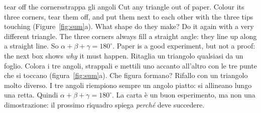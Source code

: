 \begin{think}{tear off the corners}{strappa gli angoli}
Cut any triangle out of paper. Colour its three corners, tear them off, and put them next to each other with the three tips touching (Figure~\ref{fig:sum}a). What shape do they make? Do it again with a very different triangle.
\answer The three corners always fill a straight angle: they line up along a straight line. So $\alpha + \beta + \gamma = 180^\circ$. Paper is a good experiment, but not a proof: the next box shows \emph{why} it must happen.
\tcblower
Ritaglia un triangolo qualsiasi da un foglio. Colora i tre angoli, strappali e mettili uno accanto all'altro con le tre punte che si toccano (figura~\ref{fig:sum}a). Che figura formano? Rifallo con un triangolo molto diverso.
\answer I tre angoli riempiono sempre un angolo piatto: si allineano lungo una retta. Quindi $\alpha + \beta + \gamma = 180^\circ$. La carta è un buon esperimento, ma non una dimostrazione: il prossimo riquadro spiega \emph{perché} deve succedere.
\end{think}

